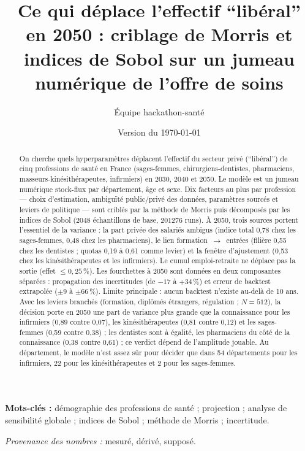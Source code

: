 \documentclass[11pt]{article}
\title{Ce qui déplace l'effectif \enquote{libéral} en 2050 : criblage de Morris et indices de Sobol sur un jumeau numérique de l'offre de soins}
\author[1]{Équipe hackathon-santé}
\affil[1]{Projet \enquote{jumeau numérique de l'offre de soins}, dépôt \texttt{hackathon-sante/v2}}
\date{Version du \today}
\begin{document}
\maketitle

\begin{abstract}
On cherche quels hyperparamètres déplacent l'effectif du secteur privé (\enquote{libéral}) de cinq professions de santé
en France (sages-femmes, chirurgiens-dentistes, pharmaciens, masseurs-kinésithérapeutes, infirmiers) en 2030, 2040
et 2050. Le modèle est un jumeau numérique stock-flux par département, âge et sexe. Dix facteurs au plus par
profession --- choix d'estimation, ambiguïté public/privé des données, paramètres sourcés et leviers de politique
--- sont criblés par la méthode de Morris puis décomposés par les indices de Sobol (\num{2048} échantillons de
base, \num{201276}\mesure{} runs). À 2050, trois sources portent l'essentiel de la variance : la part privée des
salariés ambigus (indice total 0,78\mesure{} chez les sages-femmes, 0,48\mesure{} chez les pharmaciens), le lien
formation~$\to$~entrées (filière 0,55\mesure{} chez les dentistes ; quotas 0,19 à 0,61\mesure{} comme levier) et la
fenêtre d'ajustement (0,53\mesure{} chez les kinésithérapeutes et les infirmiers). Le cumul emploi-retraite ne
déplace pas la sortie (effet $\le 0{,}25$\,\%\mesure{}). Les fourchettes à 2050 sont données en deux composantes
séparées : propagation des incertitudes (de $-17$ à $+34$\,\%\mesure{}) et erreur de backtest extrapolée
($\pm 9$ à $\pm 66$\,\%\derive{}). Limite principale : aucun backtest n'existe au-delà de 10 ans. Avec les leviers branchés (formation, diplômés étrangers, régulation ; $N = 512$), la
décision porte en 2050 une part de variance plus grande que la connaissance pour les infirmiers (0,89 contre
0,07\mesure{}), les kinésithérapeutes (0,81 contre 0,12\mesure{}) et les sages-femmes (0,59 contre 0,38\mesure{}) ;
les dentistes sont à égalité, les pharmaciens du côté de la connaissance (0,38 contre 0,61\mesure{}) ; ce verdict
dépend de l'amplitude jouable. Au département, le modèle n'est assez sûr pour décider que dans 54\mesure{}
départements pour les infirmiers, 22\mesure{} pour les kinésithérapeutes et 2\mesure{} pour les sages-femmes.
\end{abstract}
\noindent\textbf{Mots-clés :} démographie des professions de santé ; projection ; analyse de sensibilité globale ;
indices de Sobol ; méthode de Morris ; incertitude.

\noindent\textit{Provenance des nombres :} \mesure{} mesuré, \derive{} dérivé, \suppose{} supposé.
\end{document}
